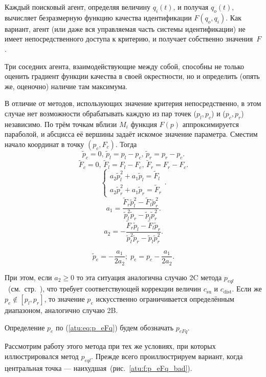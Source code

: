 Каждый поисковый агент, определяя величину $q_{i}(t)$, и получая $q_o(t)$,
вычисляет безразмерную функцию качества идентификации
$F(q_o,q_i)$. Как вариант, агент (или даже вся управляемая часть системы идентификации)
не имеет непосредственного доступа к критерию,
и получает собственно значения~$F$.




Три соседних агента, взаимодействующие между собой,
способны не только оценить градиент функции качества в своей окрестности,
но и определить (опять же, оценочно) наличие там максимума.

В отличие от методов, использующих значение критерия непосредственно,
в этом случае нет возможности обрабатывать
каждую из пар точек ($p_l,p_c$) и ($p_c,p_r$) независимо.
По трём точкам вблизи  $M_{i}$
функция $F(p)$ аппроксимируется параболой, и абсцисса её вершины задаёт искомое
значение параметра. Сместим начало координат в точку
$ ( p_c, F_c ) $. Тогда
%
\[
  \tilde{p}_c = 0, \,
  \tilde{p}_l = p_l - p_c, \,
  \tilde{p}_r = p_r - p_c.
\]
%
\[
  \tilde{F}_c = 0, \,
  \tilde{F}_l = F_l - F_c, \,
  \tilde{F}_r = F_r - F_c.
\]
%
\[
  \left\{
    \begin{array}{l}
      a_2 \tilde{p}_l^2 + a_1 \tilde{p}_l  = \tilde{F}_l
      \\
      a_2 \tilde{p}_r^2 + a_1 \tilde{p}_r  = \tilde{F}_r
    \end{array}
  \right. .
\]
%
\[
  a_1 = \frac{\tilde{F}_r \tilde{p}_l^2 - \tilde{F}_l \tilde{p}_r^2 }
             { \tilde{p}_l^2 \tilde{p}_r  - \tilde{p}_l \tilde{p}_r^2 }.
\]
%
\[
  a_2 = - \frac{\tilde{F}_r \tilde{p}_l - \tilde{F}_l \tilde{p}_r }
               { \tilde{p}_l^2 \tilde{p}_r  - \tilde{p}_l \tilde{p}_r^2 }.
\]

\begin{equation}
  \tilde{p}_e = - \frac{a_1}{2 a_2};
  \;
  p_e = p_c - \frac{a_1}{2 a_2}.
  \label{atu:eq:p_eFq}
\end{equation}


При этом, если
$ a_2 \ge 0 $
то эта ситуация аналогична случаю 2C метода $p_{eql}$~(см.~стр.~\pageref{atu:d:p_eql_2A}),
что требует соответствующей коррекции величин $c_\mathrm{su}$ и $c_\mathrm{dist}$.
Если же $ p_e \notin [ p_l, p_r ] $, то значение $p_e$ искусственно
ограничивается определённым диапазоном, аналогично случаю 2B.

Определение $p_e$ по (\ref{atu:eq:p_eFq}) будем обозначать $p_{eFq}$.

Рассмотрим работу этого метода при тех же условиях,
при которых иллюстрировался метод $p_{eql}$.
Прежде всего проиллюстрируем вариант,
когда центральная точка --- наихудшая~(рис.~\ref{atu:f:p_eFq_bad}).


